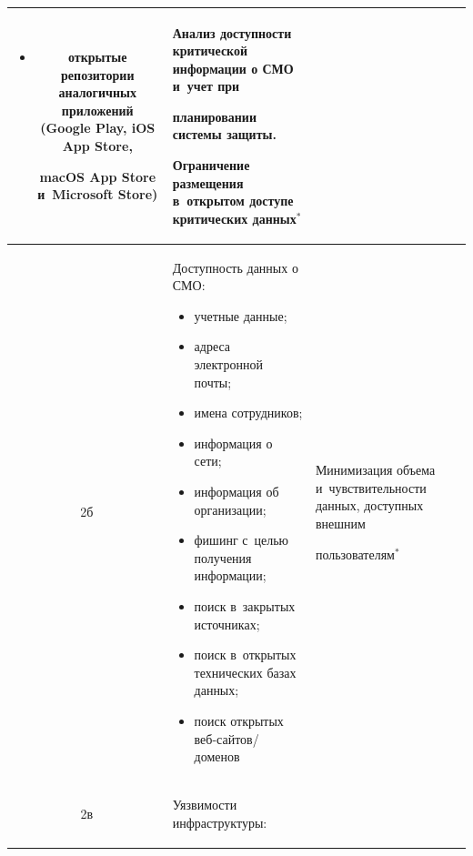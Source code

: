 \begin{table}
\begin{center}
\begin{tabular}{|c|p{66mm}|p{50mm}|}
\begin{itemize}
\item открытые репозитории аналогичных приложений (Google Play, iOS App Store, 

macOS App Store и~Microsoft Store)\vspace*{-6pt}

\end{itemize}&Анализ доступности критической информации о СМО и~учет при 

планировании системы защиты.\newline

Ограничение размещения в~открытом доступе критических данных$^{*}$\\

\hline

2б&Доступность данных о СМО:\vspace*{-6pt}

\begin{itemize}

\addtolength{\itemsep}{-6pt}

\item учетные данные;

\item адреса электронной почты;

\item имена сотрудников;

\item информация о сети;

\item информация об организации;

\item фишинг с~целью получения информации;

\item поиск в~закрытых источниках;

\item поиск в~открытых технических базах данных;

\item поиск открытых веб-сай\-тов\!/\!доменов\vspace*{-6pt}

\end{itemize}&Минимизация объема и~чувствительности данных, доступных внешним 

пользователям$^{*}$\\

\hline

2в&Уязвимости инфраструктуры:\vspace*{-6pt}

\begin{itemize}


\end{itemize}
\end{tabular}
\end{center}
\end{table}
